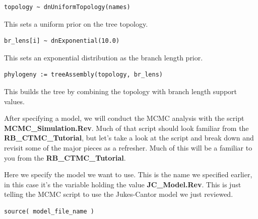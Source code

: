 {\tt \begin{snugshade*}
\begin{lstlisting}
topology ~ dnUniformTopology(names)
\end{lstlisting}
\end{snugshade*}}
This sets a uniform prior on the tree topology.
{\tt \begin{snugshade*}
\begin{lstlisting}
br_lens[i] ~ dnExponential(10.0)
\end{lstlisting}
\end{snugshade*}}
This sets an exponential distribution as the branch length prior.
{\tt \begin{snugshade*}
\begin{lstlisting}
phylogeny := treeAssembly(topology, br_lens)
\end{lstlisting}
\end{snugshade*}}
This builds the tree by combining the topology with branch length support values.

After specifying a model, we will conduct the MCMC analysis with the script  \textbf{MCMC\_Simulation.Rev}. 
Much of that script should look familiar from the \textbf{RB\_CTMC\_Tutorial}, but let's take a look at 
the script and break down and revisit some of the major pieces as a refresher. Much of this will be a 
familiar to you from the \textbf{RB\_CTMC\_Tutorial}. 

Here we specify the model we want to use. This is the name we specified earlier, in this case it's the 
variable holding the value \textbf{JC\_Model.Rev}. This is just telling the MCMC script to use the
Jukes-Cantor model we just reviewed. 

{\tt \begin{snugshade*}
\begin{lstlisting}
source( model_file_name )
\end{lstlisting}
\end{snugshade*}}

